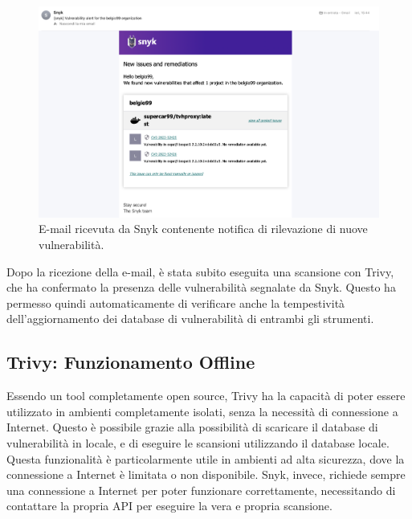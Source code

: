 \begin{figure}[H]
   \centering
   \includegraphics[width=1\textwidth]{immagini/capitolo2/snyk_email.png}
   \caption{E-mail ricevuta da Snyk contenente notifica di rilevazione di nuove vulnerabilità.}
   \label{fig:snyk_email}
\end{figure}

Dopo la ricezione della e-mail, è stata subito eseguita una scansione con Trivy, che ha confermato la presenza delle vulnerabilità segnalate da Snyk. Questo ha permesso quindi automaticamente di verificare anche la tempestività dell'aggiornamento dei database di vulnerabilità di entrambi gli strumenti.

\subsection{Trivy: Funzionamento Offline}
Essendo un tool completamente open source, Trivy ha la capacità di poter essere utilizzato in ambienti completamente isolati, senza la necessità di connessione a Internet. Questo è possibile grazie alla possibilità di scaricare il database di vulnerabilità in locale, e di eseguire le scansioni utilizzando il database locale. Questa funzionalità è particolarmente utile in ambienti ad alta sicurezza, dove la connessione a Internet è limitata o non disponibile. Snyk, invece, richiede sempre una connessione a Internet per poter funzionare correttamente, necessitando di contattare la propria API per eseguire la vera e propria scansione.

